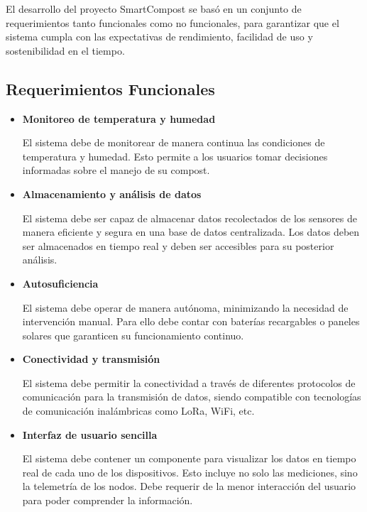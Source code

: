 El desarrollo del proyecto SmartCompost se basó en un conjunto de requerimientos tanto funcionales como no funcionales, para garantizar que el sistema cumpla con las expectativas de rendimiento, facilidad de uso y sostenibilidad en el tiempo. 

\subsection{Requerimientos Funcionales}

\begin{itemize}
    \item \textbf{Monitoreo de temperatura y humedad}
    
    El sistema debe de monitorear de manera continua las condiciones de temperatura y humedad. Esto permite a los usuarios tomar decisiones informadas sobre el manejo de su compost.

    \item \textbf{Almacenamiento y análisis de datos}
    
    El sistema debe ser capaz de almacenar datos recolectados de los sensores  de manera eficiente y segura en una base de datos centralizada. Los datos deben ser almacenados en tiempo real y deben ser accesibles para su posterior análisis.

    \item \textbf{Autosuficiencia}
    
    El sistema debe operar de manera autónoma, minimizando la necesidad de intervención manual. Para ello debe contar con baterías recargables o paneles solares que garanticen su funcionamiento continuo.

    \item \textbf{Conectividad y transmisión}
    
    El sistema debe permitir la conectividad a través de diferentes protocolos de comunicación para la transmisión de datos, siendo compatible con tecnologías de comunicación inalámbricas como LoRa, WiFi, etc.

    \item \textbf{Interfaz de usuario sencilla}
    
    El sistema debe contener un componente para visualizar los datos en tiempo real de cada uno de los dispositivos. Esto incluye no solo las mediciones, sino la telemetría de los nodos. Debe requerir de la menor interacción del usuario para poder comprender la información.
    

\end{itemize}
\newpage

